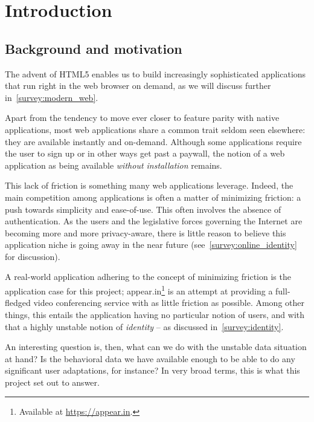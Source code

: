 \chapter{Introduction}

\label{Chapter1}


\section{Background and motivation}
\label{intro:background_and_motivation}

  The advent of HTML5 enables us to build increasingly sophisticated applications that run right in the web browser on demand, as we will discuss further in~\ref{survey:modern_web}.

  Apart from the tendency to move ever closer to feature parity with native applications, most web applications share a common trait seldom seen elsewhere: they are available instantly and on-demand. Although some applications require the user to sign up or in other ways get past a paywall, the notion of a web application as being available \emph{without installation} remains.

  This lack of friction is something many web applications leverage. Indeed, the main competition among applications is often a matter of minimizing friction: a push towards simplicity and ease-of-use. This often involves the absence of authentication. As the users and the legislative forces governing the Internet are becoming more and more privacy-aware, there is little reason to believe this application niche is going away in the near future (see~\ref{survey:online_identity} for discussion).

  A real-world application adhering to the concept of minimizing friction is the application case for this project; appear.in\footnote{Available at \url{https://appear.in}.} is an attempt at providing a full-fledged video conferencing service with as little friction as possible. Among other things, this entails the application having no particular notion of users, and with that a highly unstable notion of \emph{identity} -- as discussed in~\ref{survey:identity}.

  An interesting question is, then, what can we do with the unstable data situation at hand? Is the behavioral data we have available enough to be able to do any significant user adaptations, for instance? In very broad terms, this is what this project set out to answer.

